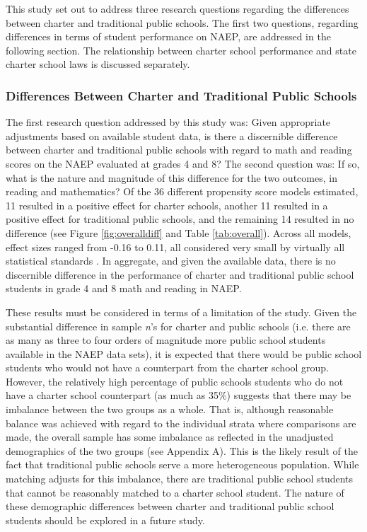 \documentclass[letterpaper,12p,twoside]{article} %
\begin{document}
This study set out to address three research questions regarding the differences between charter and traditional public schools. The first two questions, regarding differences in terms of student performance on NAEP, are addressed in the following section. The relationship between charter school performance and state charter school laws is discussed separately.

\subsubsection{Differences Between Charter and Traditional Public Schools}

The first research question addressed by this study was: Given appropriate adjustments based on available student data, is there a discernible difference between charter and traditional public schools with regard to math and reading scores on the NAEP evaluated at grades 4 and 8? The second question was: If so, what is the nature and magnitude of this difference for the two outcomes, in reading and mathematics? Of the 36 different propensity score models estimated, 11 resulted in a positive effect for charter schools, another 11 resulted in a positive effect for traditional public schools, and the remaining 14 resulted in no difference (see Figure \ref{fig:overalldiff} and Table \ref{tab:overall}). Across all models, effect sizes ranged from -0.16 to 0.11, all considered very small by virtually all statistical standards \cite{Cohen1988}. In aggregate, and given the available data, there is no discernible difference in the performance of charter and traditional public school students in grade 4 and 8 math and reading in NAEP.

These results must be considered in terms of a limitation of the study. Given the substantial difference in sample \textit{n}'s for charter and public schools (i.e. there are as many as three to four orders of magnitude more public school students available in the NAEP data sets), it is expected that there would be public school students who would not have a counterpart from the charter school group. However, the relatively high percentage of public schools students who do not have a charter school counterpart (as much as 35\%) suggests that there may be imbalance between the two groups as a whole. That is, although reasonable balance was achieved with regard to the individual strata where comparisons are made, the overall sample has some imbalance as reflected in the unadjusted demographics of the two groups (see Appendix A). This is the likely result of the fact that traditional public schools serve a more heterogeneous population. While matching adjusts for this imbalance, there are traditional public school students that cannot be reasonably matched to a charter school student. The nature of these demographic differences between charter and traditional public school students should be explored in a future study.
\end{document}

